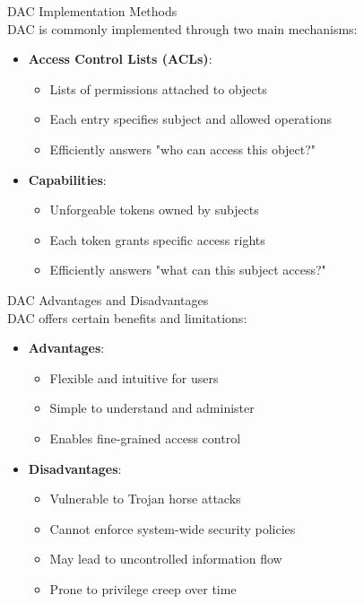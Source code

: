 \begin{concept}{DAC Implementation Methods}\\
DAC is commonly implemented through two main mechanisms:
\begin{itemize}
    \item \textbf{Access Control Lists (ACLs)}:
    \begin{itemize}
        \item Lists of permissions attached to objects
        \item Each entry specifies subject and allowed operations
        \item Efficiently answers "who can access this object?"
    \end{itemize}
    \item \textbf{Capabilities}:
    \begin{itemize}
        \item Unforgeable tokens owned by subjects
        \item Each token grants specific access rights
        \item Efficiently answers "what can this subject access?"
    \end{itemize}
\end{itemize}
\end{concept}

\begin{theorem}{DAC Advantages and Disadvantages}\\
DAC offers certain benefits and limitations:
\begin{itemize}
    \item \textbf{Advantages}:
    \begin{itemize}
        \item Flexible and intuitive for users
        \item Simple to understand and administer
        \item Enables fine-grained access control
    \end{itemize}
    \item \textbf{Disadvantages}:
    \begin{itemize}
        \item Vulnerable to Trojan horse attacks
        \item Cannot enforce system-wide security policies
        \item May lead to uncontrolled information flow
        \item Prone to privilege creep over time
    \end{itemize}
\end{itemize}
\end{theorem}

